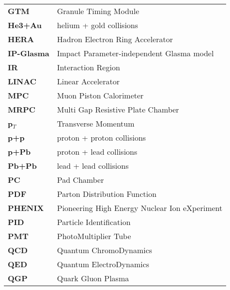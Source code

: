 \begin{center}
\begin{longtable}{l   | l}
\textbf{GTM}       & Granule Timing Module                                               \\
\textbf{He3+Au}    & helium + gold collisions                                            \\
\textbf{HERA}      & Hadron Electron Ring Accelerator                                    \\
\textbf{IP-Glasma} & Impact Parameter-independent Glasma model                           \\
\textbf{IR}        & Interaction Region                                                  \\
\textbf{LINAC}     & Linear Accelerator                                                  \\
\textbf{MPC}       & Muon Piston Calorimeter                                             \\
\textbf{MRPC}      & Multi Gap Resistive Plate Chamber                                   \\
\textbf{p$_{T}$}   & Transverse Momentum                                                 \\
\textbf{p+p}       & proton + proton collisions                                          \\
\textbf{p+Pb}      & proton + lead collisions                                            \\
\textbf{Pb+Pb}     & lead + lead collisions                                              \\
\textbf{PC}        & Pad Chamber                                                         \\
\textbf{PDF}       & Parton Distribution Function                                        \\
\textbf{PHENIX}    & Pioneering High Energy Nuclear Ion eXperiment                       \\
\textbf{PID}       & Particle Identification                                             \\
\textbf{PMT}       & PhotoMultiplier Tube                                                \\
\textbf{QCD}       & Quantum ChromoDynamics                                              \\
\textbf{QED}       & Quantum ElectroDynamics                                             \\
\textbf{QGP}       & Quark Gluon Plasma                                                  \\

\end{longtable}
\end{center}
